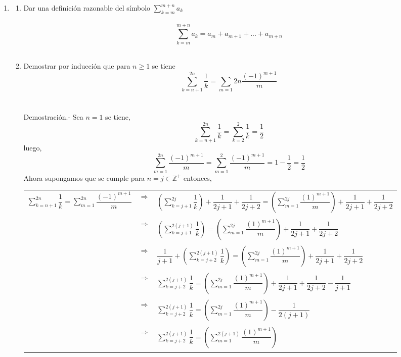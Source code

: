 \begin{enumerate}[\bfseries  1.]
\item 
\begin{enumerate}[\bfseries a)]
\item Dar una definición razonable del símbolo $\sum\limits_{k=m}^{m+n} a_k$\\\\
$$\sum\limits_{k=m}^{m+n} a_k = a_m + a_{m+1} + ... + a_{m+n}$$\\

\item Demostrar por inducción que para $n\geq 1$ se tiene
$$\displaystyle\sum_{k=n+1}^{2n} \dfrac{1}{k} = \sum_{m=1}{2n}\dfrac{(-1)^{m+1}}{m}$$\\\\
Demostración.- \; Sea $n=1$ se tiene,
$$\sum\limits_{k=n+1}^{2n} \dfrac{1}{k} = \sum\limits_{k=2}^{2} \dfrac{1}{k} = \dfrac{1}{2}$$
luego, $$\sum\limits_{m=1}^{2n} \dfrac{(-1)^{m+1}}{m} = \sum\limits_{m=1}^{2} \dfrac{(-1)^{m+1}}{m} = 1 - \dfrac{1}{2} = \dfrac{1}{2}$$
Ahora supongamos que se cumple para $n=j \in \mathbb{Z}^+$ entonces,
\begin{center}
\begin{tabular}{r c l}
$\sum\limits_{k=n+1}^{2n} \dfrac{1}{k} = \sum\limits_{m=1}^{2n}\dfrac{(-1)^{m+1}}{m}$&$\Rightarrow$&$\left( \sum\limits_{k=j+1}^{2j} \dfrac{1}{k} \right) + \dfrac{1}{2j+1} + \dfrac{1}{2j+2} = \left( \sum\limits_{m=1}^{2j} \dfrac{(1)^{m+1}}{m} \right) + \dfrac{1}{2j+1} + \dfrac{1}{2j+2}$\\\\
&$\Rightarrow$&$\left( \sum\limits_{k=j+1}^{2(j+1)} \dfrac{1}{k} \right)  = \left( \sum\limits_{m=1}^{2j} \dfrac{(1)^{m+1}}{m} \right) + \dfrac{1}{2j+1} + \dfrac{1}{2j+2}$\\\\
&$\Rightarrow$&$\dfrac{1}{j+1} + \left( \sum\limits_{k=j+2}^{2(j+1)} \dfrac{1}{k} \right) = \left( \sum\limits_{m=1}^{2j} \dfrac{(1)^{m+1}}{m} \right) + \dfrac{1}{2j+1} + \dfrac{1}{2j+2}$\\\\
&$\Rightarrow$&$\sum\limits_{k=j+2}^{2(j+1)} \dfrac{1}{k} = \left( \sum\limits_{m=1}^{2j} \dfrac{(1)^{m+1}}{m} \right) + \dfrac{1}{2j+1} + \dfrac{1}{2j+2} - \dfrac{1}{j+1}$\\\\
&$\Rightarrow$&$\sum\limits_{k=j+2}^{2(j+1)} \dfrac{1}{k} = \left( \sum\limits_{m=1}^{2j} \dfrac{(1)^{m+1}}{m} \right)  - \dfrac{1}{2(j+1)}$\\\\
&$\Rightarrow$&$\sum\limits_{k=j+2}^{2(j+1)} \dfrac{1}{k} = \left( \sum\limits_{m=1}^{2(j+1)} \dfrac{(1)^{m+1}}{m} \right)$\\\\
\end{tabular}
\end{center}
\end{enumerate}


\end{enumerate}
